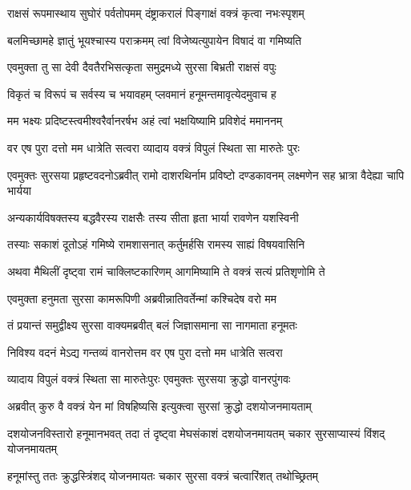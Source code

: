 \twolineshloka
{राक्षसं रूपमास्थाय सुघोरं पर्वतोपमम्}
{दंष्ट्राकरालं पिङ्गाक्षं वक्त्रं कृत्वा नभःस्पृशम्} %

\twolineshloka
{बलमिच्छामहे ज्ञातुं भूयश्चास्य पराक्रमम्}
{त्वां विजेष्यत्युपायेन विषादं वा गमिष्यति} %

\twolineshloka
{एवमुक्ता तु सा देवी दैवतैरभिसत्कृता}
{समुद्रमध्ये सुरसा बिभ्रती राक्षसं वपुः} %

\twolineshloka
{विकृतं च विरूपं च सर्वस्य च भयावहम्}
{प्लवमानं हनूमन्तमावृत्येदमुवाच ह} %

\twolineshloka
{मम भक्ष्यः प्रदिष्टस्त्वमीश्वरैर्वानरर्षभ}
{अहं त्वां भक्षयिष्यामि प्रविशेदं ममाननम्} %

\twolineshloka
{वर एष पुरा दत्तो मम धात्रेति सत्वरा}
{व्यादाय वक्त्रं विपुलं स्थिता सा मारुतेः पुरः} %

\threelineshloka
{एवमुक्तः सुरसया प्रहृष्टवदनोऽब्रवीत्}
{रामो दाशरथिर्नाम प्रविष्टो दण्डकावनम्}
{लक्ष्मणेन सह भ्रात्रा वैदेह्या चापि भार्यया} %

\twolineshloka
{अन्यकार्यविषक्तस्य बद्धवैरस्य राक्षसैः}
{तस्य सीता हृता भार्या रावणेन यशस्विनी} %

\twolineshloka
{तस्याः सकाशं दूतोऽहं गमिष्ये रामशासनात्}
{कर्तुमर्हसि रामस्य साह्यं विषयवासिनि} %

\twolineshloka
{अथवा मैथिलीं दृष्ट्वा रामं चाक्लिष्टकारिणम्}
{आगमिष्यामि ते वक्त्रं सत्यं प्रतिशृणोमि ते} %

\twolineshloka
{एवमुक्ता हनुमता सुरसा कामरूपिणी}
{अब्रवीन्नातिवर्तेन्मां कश्चिदेष वरो मम} %

\twolineshloka
{तं प्रयान्तं समुद्वीक्ष्य सुरसा वाक्यमब्रवीत्}
{बलं जिज्ञासमाना सा नागमाता हनूमतः} %

\twolineshloka
{निविश्य वदनं मेऽद्य गन्तव्यं वानरोत्तम}
{वर एष पुरा दत्तो मम धात्रेति सत्वरा} %

\twolineshloka
{व्यादाय विपुलं वक्त्रं स्थिता सा मारुतेःपुरः}
{एवमुक्तः सुरसया क्रुद्धो वानरपुंगवः} %

\twolineshloka
{अब्रवीत् कुरु वै वक्त्रं येन मां विषहिष्यसि}
{इत्युक्त्वा सुरसां क्रुद्धो दशयोजनमायताम्} %

\threelineshloka
{दशयोजनविस्तारो हनूमानभवत् तदा}
{तं दृष्ट्वा मेघसंकाशं दशयोजनमायतम्}
{चकार सुरसाप्यास्यं विंशद् योजनमायतम्} %

\twolineshloka
{हनूमांस्तु ततः क्रुद्धस्त्रिंशद् योजनमायतः}
{चकार सुरसा वक्त्रं चत्वारिंशत् तथोच्छ्रितम्} %

